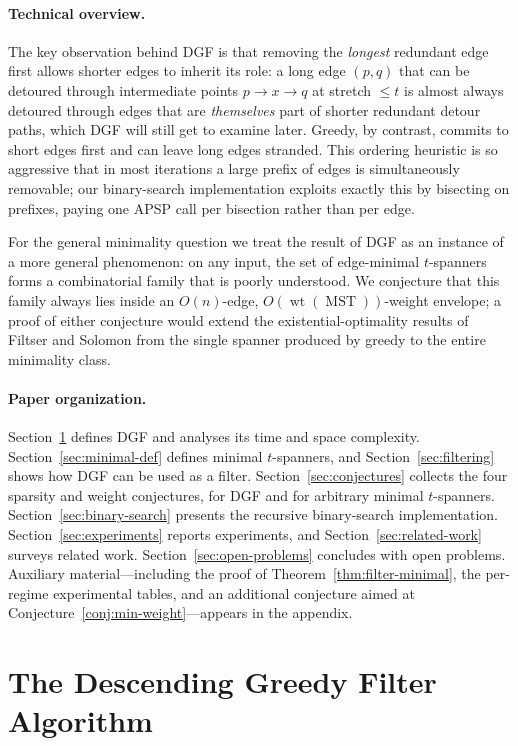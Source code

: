 \documentclass{cccg26}
\DeclareMathOperator{\wt}{wt}
\DeclareMathOperator{\MST}{MST}
\begin{document}
\paragraph{Technical overview.}
The key observation behind DGF is that removing the \emph{longest}
redundant edge first allows shorter edges to inherit its role: a long
edge $(p,q)$ that can be detoured through intermediate points
$p\!\to\!x\!\to\!q$ at stretch $\le t$ is almost always detoured
through edges that are \emph{themselves} part of shorter redundant
detour paths, which DGF will still get to examine later. Greedy, by
contrast, commits to short edges first and can leave long edges
stranded. This ordering heuristic is so aggressive that in most
iterations a large prefix of edges is simultaneously removable; our
binary-search implementation exploits exactly this by bisecting on
prefixes, paying one APSP call per bisection rather than per edge.

For the general minimality question we treat the result of DGF as an
instance of a more general phenomenon: on any input, the set of
edge-minimal $t$-spanners forms a combinatorial family that is poorly
understood. We conjecture that this family always lies inside an
$O(n)$-edge, $O(\wt(\MST))$-weight envelope; a proof of either
conjecture would extend the existential-optimality results of Filtser
and Solomon from the single spanner produced by greedy to the entire
minimality class.

\paragraph{Paper organization.}
Section~\ref{sec:algorithm} defines DGF and analyses its time and space
complexity. Section~\ref{sec:minimal-def} defines minimal
$t$-spanners, and Section~\ref{sec:filtering} shows how DGF can be
used as a filter. Section~\ref{sec:conjectures} collects the four
sparsity and weight conjectures, for DGF and for arbitrary minimal
$t$-spanners.
Section~\ref{sec:binary-search} presents the recursive binary-search
implementation. Section~\ref{sec:experiments} reports experiments,
and Section~\ref{sec:related-work} surveys related work.
Section~\ref{sec:open-problems} concludes with open problems.
Auxiliary material---including the proof of
Theorem~\ref{thm:filter-minimal}, the per-regime experimental tables,
and an additional conjecture aimed at
Conjecture~\ref{conj:min-weight}---appears in the appendix.

\section{The Descending Greedy Filter Algorithm}
\label{sec:algorithm}
\end{document}
